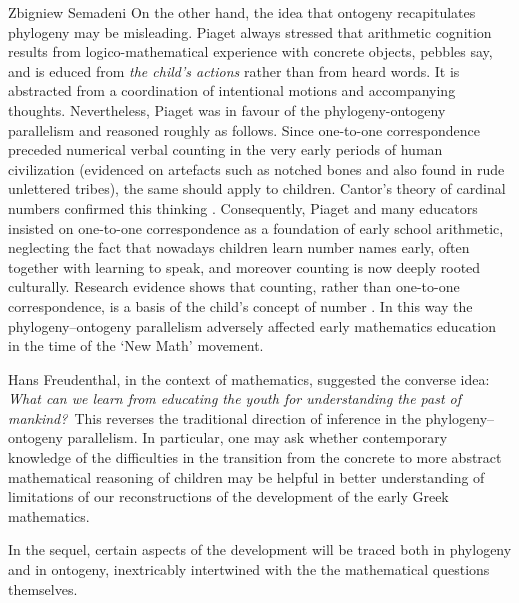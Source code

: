 \begin{artengenv}{Zbigniew Semadeni}
On the other hand, the idea that ontogeny recapitulates phylogeny may be misleading. 
Piaget always stressed that arithmetic cognition results from logico-mathematical 
experience with concrete objects, pebbles say, and is educed from \textit{the 
child’s actions} rather than from heard words. It is abstracted from a coordination of 
intentional motions and accompanying thoughts. Nevertheless, Piaget was in favour 
of the phylogeny-ontogeny parallelism and reasoned roughly as follows. Since 
one-to-one correspondence preceded numerical verbal counting in the very early 
periods of human civilization (evidenced on artefacts such as notched bones and 
also found in rude unlettered tribes), the same should apply to children. Cantor’s 
theory of cardinal numbers confirmed this thinking \parencite[pp.259--260]{B-P}.
Consequently, Piaget and many educators insisted on one-to-one correspondence 
as a foundation of early school arithmetic, neglecting the fact that nowadays 
children learn number names early, often together with learning to speak, and 
moreover counting is now deeply rooted culturally. Research evidence shows that 
counting, rather than one-to-one correspondence, is a basis of the child’s 
concept of number \parencite[pp.77--82]{G-G}.
In this way the phylogeny–ontogeny parallelism adversely affected early mathematics 
education in the time of the `New Math' movement. 

Hans Freudenthal, in the context of mathematics, suggested the converse idea: 
\textit{What can we learn from educating the youth for understanding the past of 
mankind?} \,This reverses the traditional direction of inference in the 
phylogeny–ontogeny parallelism. In particular, one may ask whether contemporary 
knowledge of the difficulties in the transition from the concrete to more abstract 
mathematical reasoning of children may be helpful in better understanding of 
limitations of our reconstructions of the development of the early Greek mathematics.  

In the sequel, certain aspects of the development will be traced both in phylogeny 
and in ontogeny, inextricably %
intertwined with the the mathematical questions themselves. 


\end{artengenv}

